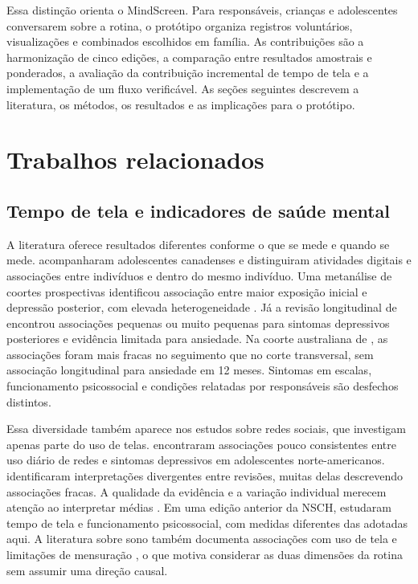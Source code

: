 ﻿\documentclass[12pt]{article}
\begin{document}
Essa distinção orienta o MindScreen. Para responsáveis, crianças e adolescentes conversarem sobre a rotina, o protótipo organiza registros voluntários, visualizações e combinados escolhidos em família. As contribuições são a harmonização de cinco edições, a comparação entre resultados amostrais e ponderados, a avaliação da contribuição incremental de tempo de tela e a implementação de um fluxo verificável. As seções seguintes descrevem a literatura, os métodos, os resultados e as implicações para o protótipo.

\section{Trabalhos relacionados}
\subsection{Tempo de tela e indicadores de saúde mental}
A literatura oferece resultados diferentes conforme o que se mede e quando se mede. \cite{boers2019} acompanharam adolescentes canadenses e distinguiram atividades digitais e associações entre indivíduos e dentro do mesmo indivíduo. Uma metanálise de coortes prospectivas identificou associação entre maior exposição inicial e depressão posterior, com elevada heterogeneidade \cite{gao2024}. Já a revisão longitudinal de \cite{tang2021} encontrou associações pequenas ou muito pequenas para sintomas depressivos posteriores e evidência limitada para ansiedade. Na coorte australiana de \cite{li2025}, as associações foram mais fracas no seguimento que no corte transversal, sem associação longitudinal para ansiedade em 12 meses. Sintomas em escalas, funcionamento psicossocial e condições relatadas por responsáveis são desfechos distintos.

Essa diversidade também aparece nos estudos sobre redes sociais, que investigam apenas parte do uso de telas. \cite{kreski2021} encontraram associações pouco consistentes entre uso diário de redes e sintomas depressivos em adolescentes norte-americanos. \cite{valkenburg2022} identificaram interpretações divergentes entre revisões, muitas delas descrevendo associações fracas. A qualidade da evidência e a variação individual merecem atenção ao interpretar médias \cite{stiglic2019,orben2020}. Em uma edição anterior da NSCH, \cite{przybylski2020} estudaram tempo de tela e funcionamento psicossocial, com medidas diferentes das adotadas aqui. A literatura sobre sono também documenta associações com uso de tela e limitações de mensuração \cite{hale2015}, o que motiva considerar as duas dimensões da rotina sem assumir uma direção causal.
\end{document}
